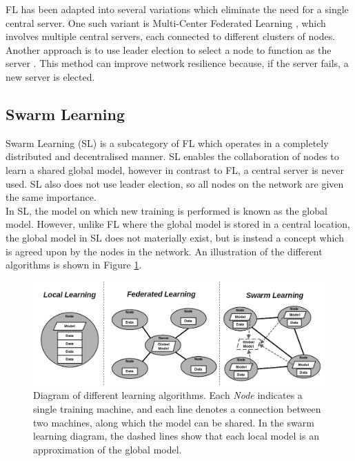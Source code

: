 \documentclass[letterpaper, 10 pt, conference]{ieeeconf}  %
\begin{document}
FL has been adapted into several variations which eliminate the need for a single central server. One such variant is Multi-Center Federated Learning \cite{multi_center_fed_learning}, which involves multiple central servers, each connected to different clusters of nodes. Another approach is to use leader election to select a node to function as the server \cite{fed_leaderelec}. This method can improve network resilience because, if the server fails, a new server is elected.

\subsection{Swarm Learning}
Swarm Learning (SL) is a subcategory of FL which operates in a completely distributed and decentralised manner. SL enables the collaboration of nodes to learn a shared global model, however in contrast to FL, a central server is never used. SL also does not use leader election, so all nodes on the network are given the same importance. \\

In SL, the model on which new training is performed is known as the global model. However, unlike FL where the global model is stored in a central location, the global model in SL does not materially exist, but is instead a concept which is agreed upon by the nodes in the network. An illustration of the different algorithms is shown in Figure \ref{fig_learning}. \\

\begin{figure}[h]
	\includegraphics[width=\linewidth]{fedvsswarm}
	\caption{Diagram of different learning algorithms. Each \emph{Node} indicates a single training machine, and each line denotes a connection between two machines, along which the model can be shared. In the swarm learning diagram, the dashed lines show that each local model is an approximation of the global model.} \label{fig_learning}
\end{figure}
\end{document}
